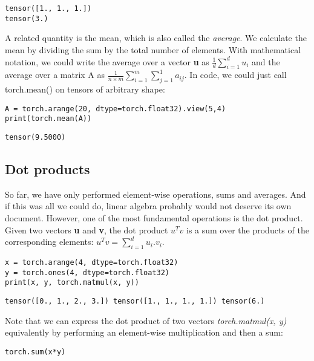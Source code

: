 \documentclass[]{article}
\begin{document}
\begin{verbatim}
tensor([1., 1., 1.])
tensor(3.)
\end{verbatim}

A related quantity is the mean, which is also called the \textit{average}. We calculate the mean by dividing the sum by the total number of elements. With mathematical notation, we could write the average over a vector \textbf{u} as $  \frac{1}{d} \sum_{i=1}^{d} u_i $ and the average over a matrix A as $ \frac{1}{n \times m} \sum_{i=1}^{m} \sum_{j=1}^{1} a_{ij} $. In code, we could just call torch.mean() on tensors of arbitrary shape:

\begin{verbatim}
A = torch.arange(20, dtype=torch.float32).view(5,4)
print(torch.mean(A))
\end{verbatim}

\begin{verbatim}
tensor(9.5000)
\end{verbatim}

\subsection{Dot products}

So far, we have only performed element-wise operations, sums and averages. And if this was all we could do, linear algebra probably would not deserve its own document.  However, one of the most fundamental operations is the dot product. Given two vectors \textbf{u} and \textbf{v}, the dot product $ u^T v $ is a sum over the products of the corresponding elements: $ u^T v = \sum_{i=1}^{d} u_i . v_i $.

\begin{verbatim}
x = torch.arange(4, dtype=torch.float32)
y = torch.ones(4, dtype=torch.float32)
print(x, y, torch.matmul(x, y))
\end{verbatim}

\begin{verbatim}
tensor([0., 1., 2., 3.]) tensor([1., 1., 1., 1.]) tensor(6.)
\end{verbatim}

Note that we can express the dot product of two vectors \textit{torch.matmul(x, y)} equivalently by performing an element-wise multiplication and then a sum:

\begin{verbatim}
torch.sum(x*y)
\end{verbatim}
\end{document}
